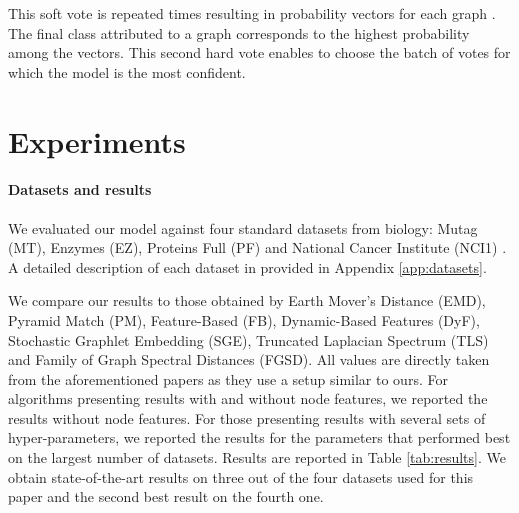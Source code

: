 \documentclass{article} \usepackage{iclr2019_conference}
\begin{document}
This soft vote is repeated  times resulting in  probability vectors  for each graph . The final class attributed to a graph corresponds to the highest probability among the  vectors.  
This second hard vote enables to choose the batch of votes for which the model is the most confident.


\section{Experiments}
\label{sec:experiments}

\paragraph{Datasets and results}

We evaluated our model against four standard datasets from biology: Mutag (MT), Enzymes (EZ), Proteins Full (PF) and National Cancer Institute (NCI1) \citep{KKMMN2016}. A detailed description of each dataset in provided in Appendix \ref{app:datasets}.

We compare our results to those obtained by Earth Mover's Distance \citep{nikolentzos2017matching} (EMD), Pyramid Match \citep{nikolentzos2017matching} (PM), Feature-Based \citep{barnett2016feature} (FB), Dynamic-Based Features \citep{gomez2017dynamics} (DyF), Stochastic Graphlet Embedding \citep{dutta2017high} (SGE), Truncated Laplacian Spectrum \citep{de2018simple} (TLS) and Family of Graph Spectral Distances \citep{verma2017hunt} (FGSD). All values are directly taken from the aforementioned papers as they use a setup similar to ours. For algorithms presenting results with and without node features, we reported the results without node features. For those presenting results with several sets of hyper-parameters, we reported the results for the parameters that performed best on the largest number of datasets. Results are reported in Table \ref{tab:results}. We obtain state-of-the-art results on three out of the four datasets used for this paper and the second best result on the fourth one. 
\end{document}
